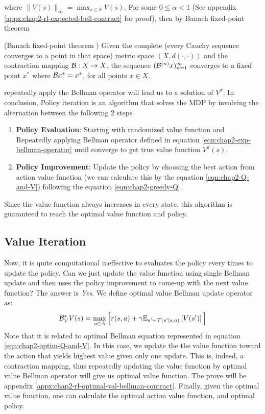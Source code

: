 where $\|V(s)\|_\infty = \max_{s \in S} V(s)$. For some $0 \le \alpha < 1$ (See appendix \ref{appx:chap2-rl-expected-bell-contract} for proof), then by Banach fixed-point theorem
\begin{theorem}{(Banach fixed-point theorem \cite{murfet_2019})}
    Given the complete (every Cauchy sequence converges to a point in that space) metric space $(X, d(\cdot, \cdot))$ and the contraction mapping $\mathcal{B} : X \rightarrow X$, the sequence $(\mathcal{B}^{(n)} x)^{\infty}_{n=1}$ converges to a fixed point $x^*$ where $\mathcal{B} x^* = x^*$, for all points $x \in X$. 
\end{theorem}
repeatedly apply the Bellman operator will lead us to a solution of $V^{\pi}$.  In conclusion, Policy iteration is an algorithm that solves the MDP by involving the alternation between the following 2 steps
\begin{enumerate}
    \item \textbf{Policy Evaluation}: Starting with randomized value function and Repeatedly applying Bellman operator defined in equation \ref{eqn:chap2-exp-bellman-operator} until converge to get true value function $V^{\pi}(s)$.
    \item \textbf{Policy Improvement}: Update the policy by choosing the best action from action value function (we can calculate this by the equation \ref{eqn:chap2-Q-and-V}) following the equation \ref{eqn:chap2-greedy-Q}.
\end{enumerate}
Since the value function always increases in every state, this algorithm is guaranteed to reach the optimal value function and policy. 

\subsection{Value Iteration}
\label{sec:chap2-value-iter}
Now, it is quite computational ineffective to evaluates the policy every times to update the policy. Can we just update the value function using single Bellman update and then uses the policy improvement to come-up with the next value function? The answer is \textit{Yes}. We define optimal value Bellman update operator as:
\begin{equation}
    \label{eqn:chap2-optimal-bellman-operator}
    \mathcal{B}^*_V V(s) = \max_{a \in A}\Big[r(s, a) + \gamma \mathbb{E}_{s' \sim \mathcal{T}(s' | s, a)}\left[ V(s') \right] \Big]
\end{equation}
Note that it is related to optimal Bellman equation represented in equation \ref{eqn:chap2-optim-Q-and-V}. In this case, we update the the value function toward the action that yields highest value given only one update. This is, indeed, a contraction mapping, thus repeatedly updating the value function by optimal value Bellman operator will give us optimal value function. The prove will be appendix \ref{appx:chap2-rl-optimal-val-bellman-contract}. Finally, given the optimal value function, one can calculate the optimal action value function, and optimal policy. 

